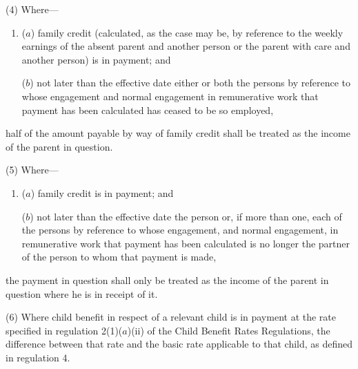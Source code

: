 \documentclass[12pt,a4paper]{article}
\begin{document}
(4) Where—
\begin{enumerate}\item[]
($a$) family credit (calculated, as the case may be, by reference to the weekly earnings of the absent parent and another person or the parent with care and another person) is in payment; and

($b$) not later than the effective date either or both the persons by reference to whose engagement and normal engagement in remunerative work that payment has been calculated has ceased to be so employed,
\end{enumerate}
half of the amount payable by way of family credit shall be treated as the income of the parent in question.

(5) Where—
\begin{enumerate}\item[]
($a$) family credit is in payment; and

($b$) not later than the effective date the person or, if more than one, each of the persons by reference to whose engagement, and normal engagement, in remunerative work that payment has been calculated is no longer the partner of the person to whom that payment is made,
\end{enumerate}
the payment in question shall only be treated as the income of the parent in question where he is in receipt of it.

(6) Where child benefit in respect of a relevant child is in payment at the rate specified in regulation 2(1)($a$)(ii) of the Child Benefit Rates Regulations, the difference between that rate and the basic rate applicable to that child, as defined in regulation 4.

\end{document}
